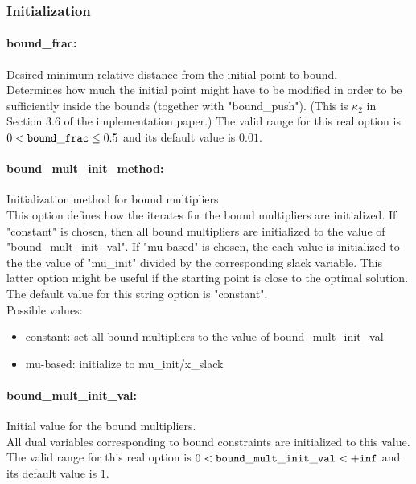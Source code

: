 \subsubsection{Initialization}
\label{sec:Initialization}

\paragraph{bound\_frac:}\label{sec:bound_frac} Desired minimum relative distance from the initial point to bound. $\;$ \\
 Determines how much the initial point might have
to be modified in order to be sufficiently inside
the bounds (together with "bound\_push").  (This
is $\kappa_2$ in Section 3.6 of the implementation
paper.) The valid range for this real option is 
$0 <  {\tt bound\_frac } \le 0.5$
and its default value is $0.01$.


\paragraph{bound\_mult\_init\_method:}\label{sec:bound_mult_init_method} Initialization method for bound multipliers $\;$ \\
 This option defines how the iterates for the
bound multipliers are initialized.  If "constant"
is chosen, then all bound multipliers are
initialized to the value of
"bound\_mult\_init\_val".  If "mu-based" is
chosen, the each value is initialized to the the
value of "mu\_init" divided by the corresponding
slack variable.  This latter option might be
useful if the starting point is close to the
optimal solution.
The default value for this string option is "constant".
\\ 
Possible values:
\begin{itemize}
   \item constant: set all bound multipliers to the value of
bound\_mult\_init\_val
   \item mu-based: initialize to mu\_init/x\_slack
\end{itemize}

\paragraph{bound\_mult\_init\_val:}\label{sec:bound_mult_init_val} Initial value for the bound multipliers. $\;$ \\
 All dual variables corresponding to bound
constraints are initialized to this value. The valid range for this real option is 
$0 <  {\tt bound\_mult\_init\_val } <  {\tt +inf}$
and its default value is $1$.



